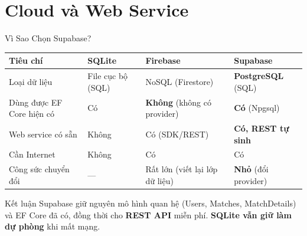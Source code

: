 \section{Cloud và Web Service}

\begin{frame}{Vì Sao Chọn Supabase?}
  \small
  \renewcommand{\arraystretch}{1.25}
  \begin{tabularx}{\textwidth}{@{}l Y Y Y@{}}
    \toprule
    \textbf{Tiêu chí} & \textbf{SQLite} & \textbf{Firebase} & \textbf{Supabase} \\
    \midrule
    Loại dữ liệu & File cục bộ (SQL) & NoSQL (Firestore) & \textbf{PostgreSQL} (SQL) \\
    Dùng được EF Core hiện có & Có & \textbf{Không} (không có provider) & \textbf{Có} (Npgsql) \\
    Web service có sẵn & Không & Có (SDK/REST) & \textbf{Có, REST tự sinh} \\
    Cần Internet & Không & Có & Có \\
    Công sức chuyển đổi & --- & Rất lớn (viết lại lớp dữ liệu) & \textbf{Nhỏ} (đổi provider) \\
    \bottomrule
  \end{tabularx}
  \vspace{0.3cm}
  \begin{exampleblock}{Kết luận}
    Supabase giữ nguyên mô hình quan hệ (Users, Matches, MatchDetails) và EF Core đã có, đồng thời cho \textbf{REST API} miễn phí. \textbf{SQLite vẫn giữ làm dự phòng} khi mất mạng.
  \end{exampleblock}
\end{frame}


